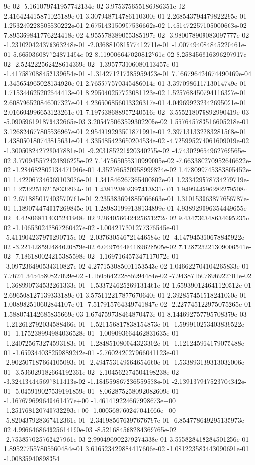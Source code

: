 9e-02	-5.161079741957742134e-02	3.975375655186986351e-02	2.416424415871025189e-01	3.307948714786110300e-01	2.268543794479822295e-01	1.253249228505530222e-01	2.675143150997536662e-02	1.451472257105000663e-02	7.895369841776224418e-02	4.955578389055385197e-02	-3.980078909083097777e-02	-1.231020424376363248e-01	-2.036881081577412711e-01	-1.007494084845220461e-01	5.665036087724871494e-02	8.119006647020812761e-02	8.258456816396297917e-02	-2.524222562428614369e-02	-1.395773106080113457e-01	-1.417587088452139654e-01	-1.314271217385959423e-01	7.166796424674490469e-04	1.345654965028134920e-01	2.765577570345486014e-01	3.397098611713014749e-01	1.715344625202644413e-01	8.295040257723081123e-02	1.525768450794116327e-01	2.608796520846007327e-01	4.236606856013326317e-01	4.049699232342695021e-01	2.016604996653123261e-01	7.197638688957240516e-02	-3.555218076892990419e-03	-5.090596191879432665e-03	3.205475063599302205e-02	1.567645783516605218e-01	3.126824677805536967e-01	2.954919293501871991e-01	2.397131332283281568e-01	1.438050180743815631e-01	4.335485423650204534e-02	-4.725995274061609019e-02	-1.300508242728047881e-01	-9.203185221920340275e-02	-4.743029664962769565e-02	3.770945572424896225e-02	7.147565055310999005e-02	-7.663380270952646622e-02	-1.284682802134471946e-01	4.352766520958999824e-02	1.478099745383805452e-01	1.422067346369103036e-01	1.341846267365400802e-01	1.233429578734279719e-01	1.273225162158332924e-01	1.438123802397413831e-01	1.949944596282279508e-01	2.671885017403570761e-01	2.235383694885066663e-01	1.310153063877656787e-01	1.189074474017269845e-01	1.289831999138134899e-01	4.938929096354449655e-02	-4.428068114035241948e-02	2.264056642425651272e-02	9.434736348634695235e-02	-1.106530243867260427e-02	-1.004217301277376545e-01	-5.411904237970290715e-02	-2.037630546721446584e-02	-4.147945360678845922e-02	-3.221428592484620879e-02	6.049764484189628505e-02	7.128723221309006541e-02	-7.186180024215385598e-02	-1.169716457347117072e-01	-3.097236490534310827e-02	4.277153085001153543e-02	1.046622704104265833e-01	7.762413454580827099e-02	-1.150564222885994484e-02	-7.943871507896922701e-02	-1.368990734532261333e-01	-1.533724625269131461e-02	1.659390124641120512e-01	2.696508127139333189e-01	3.575112217877670640e-01	2.392857451518241030e-01	1.008982510602844107e-01	-7.517915764349741847e-02	-2.227745122975075265e-01	1.588074142685835669e-03	1.674759738464870473e-01	8.144692757795708379e-03	-1.212612792034588466e-01	-1.521156817838154873e-01	-1.599910253403839522e-01	-1.175238994984036528e-01	-1.009093664462831635e-01	-1.240725673274593183e-01	-1.284851080044323302e-01	-1.121245964179075488e-01	-1.659344038259889242e-01	-2.760242027966041123e-01	-2.902507187664105093e-01	-2.494753149564654660e-01	-1.533893139313032006e-01	-3.536029182664192361e-02	-2.104562374504198238e-02	-3.324134445697811413e-02	-1.184559867236559538e-01	-2.139137947523704342e-01	-5.045919027539191859e-01	-8.062875258092082609e-01	-1.167679699640461477e+00	-1.461419224667998673e+00	-1.251768120740732293e+00	-1.000568760247041666e+00	-5.820437928367412361e-01	-2.341985676397676797e-01	-6.854778649295135973e-02	4.996646864925614190e-03	-8.521684568284369765e-02	-2.753857025762427961e-03	2.990496902279274338e-01	3.565828418284501256e-01	1.895277557805660484e-01	3.616523429884417606e-02	-1.081223583443090691e-01	-1.00835940898354
